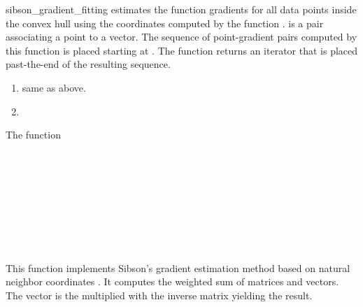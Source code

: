 \begin{ccRefFunction}{sibson_gradient_fitting}
 {estimates
  the function gradients for all data points inside the convex hull
  using the coordinates computed by the function
  .
   is a pair associating a point to a
  vector. The sequence of point-gradient pairs computed by this
  function is placed starting at . The function returns an
  iterator that is placed past-the-end of the resulting sequence.}
\begin{enumerate}
  \item same as above.
  \item 
\end{enumerate}

\begin{ccAdvanced}
  The function 
\end{ccAdvanced}

\ccSeeAlso
{} \\
 \\
 \\
 \\
 \\
\\
 \\
\\

\ccImplementation This function implements Sibson's gradient
estimation method based on natural neighbor coordinates
\cite{s-bdnni-81}. It computes the weighted sum of matrices and
vectors. The vector is the multiplied with the inverse matrix yielding
the result.


\end{ccRefFunction}


